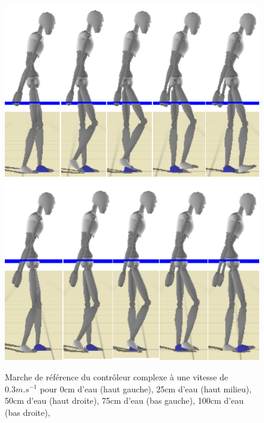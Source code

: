\documentclass[runningheads,a4paper]{llncs}
\begin{document}
\begin{figure}[h]
\includegraphics[scale=0.3]{strips/03_75cm.png}
\includegraphics[scale=0.3]{strips/03_100cm.png}
\caption{Marche de référence du contrôleur complexe à une vitesse de $0.3m.s^{-1}$ pour 0cm d'eau (haut gauche), 25cm d'eau (haut milieu), 50cm d'eau (haut droite), 75cm d'eau (bas gauche), 100cm d'eau (bas droite), }
\label{fig:joint_space_motion_control}
\label{fig:state_machine}
\end{figure}
\end{document}
